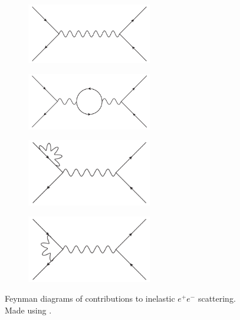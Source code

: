 \documentclass[twoside,english]{uiofysmaster}
\begin{document}
\begin{figure}[htbp]
	\centering
	\begin{subfigure}[b]{0.45\textwidth}
		\centering
		\includegraphics[width=0.6\textwidth]{figures/susyintro/epscattering.pdf}
		\caption{ }
		\label{fig:feynmandiagram_a}
	\end{subfigure}
	\begin{subfigure}[b]{0.45\textwidth}
		\centering
		\includegraphics[width=0.6\textwidth]{figures/susyintro/epscattering_fermionloop.pdf}
		\caption{ }
		\label{fig:feynmandiagram_b}
	\end{subfigure}

	\begin{subfigure}[b]{0.45\textwidth}
		\centering
		\includegraphics[width=0.6\textwidth]{figures/susyintro/epscattering_fermioncorr.pdf}
		\caption{ }
		\label{fig:feynmandiagram_c}
	\end{subfigure}
	\begin{subfigure}[b]{0.45\textwidth}
		\centering
		\includegraphics[width=0.6\textwidth]{figures/susyintro/epscattering_vertexcorr.pdf}
		\caption{ }
		\label{fig:feynmandiagram_d}
	\end{subfigure}
	\caption{Feynman diagrams of contributions to inelastic $e^+ e^-$ scattering. Made using \cite{Binosi:2003yf}.}
	\label{fig:feynmandiagram}
\end{figure}
\end{document}
